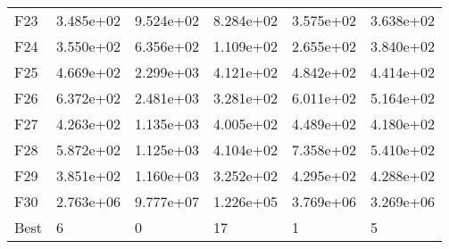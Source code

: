 \begin{tabular}{llllll}
F23  &  3.485e+02 &  9.524e+02 &  8.284e+02 &  3.575e+02 &  3.638e+02 \\
F24  &  3.550e+02 &  6.356e+02 &  1.109e+02 &  2.655e+02 &  3.840e+02 \\
F25  &  4.669e+02 &  2.299e+03 &  4.121e+02 &  4.842e+02 &  4.414e+02 \\
F26  &  6.372e+02 &  2.481e+03 &  3.281e+02 &  6.011e+02 &  5.164e+02 \\
F27  &  4.263e+02 &  1.135e+03 &  4.005e+02 &  4.489e+02 &  4.180e+02 \\
F28  &  5.872e+02 &  1.125e+03 &  4.104e+02 &  7.358e+02 &  5.410e+02 \\
F29  &  3.851e+02 &  1.160e+03 &  3.252e+02 &  4.295e+02 &  4.288e+02 \\
F30  &  2.763e+06 &  9.777e+07 &  1.226e+05 &  3.769e+06 &  3.269e+06 \\
Best &          6 &          0 &         17 &          1 &          5 \\
\bottomrule
\end{tabular}
